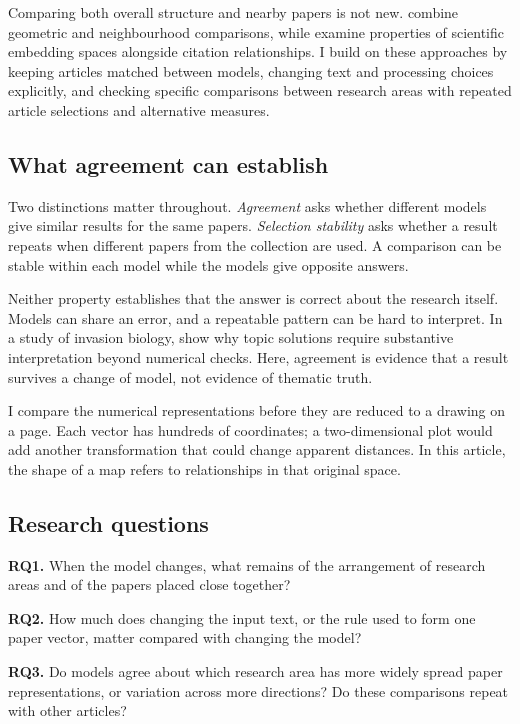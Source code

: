 \documentclass[12pt]{article}
\begin{document}
Comparing both overall structure and nearby papers is not new. \citet{ref4e1e0d5582} combine geometric and neighbourhood comparisons, while \citet{ref6da178065c} examine properties of scientific embedding spaces alongside citation relationships. I build on these approaches by keeping articles matched between models, changing text and processing choices explicitly, and checking specific comparisons between research areas with repeated article selections and alternative measures.

\subsection{What agreement can establish}
Two distinctions matter throughout. \emph{Agreement} asks whether different models give similar results for the same papers. \emph{Selection stability} asks whether a result repeats when different papers from the collection are used. A comparison can be stable within each model while the models give opposite answers.

Neither property establishes that the answer is correct about the research itself. Models can share an error, and a repeatable pattern can be hard to interpret. In a study of invasion biology, \citet{QSSreviewQ17} show why topic solutions require substantive interpretation beyond numerical checks. Here, agreement is evidence that a result survives a change of model, not evidence of thematic truth.

I compare the numerical representations before they are reduced to a drawing on a page. Each vector has hundreds of coordinates; a two-dimensional plot would add another transformation that could change apparent distances. In this article, the shape of a map refers to relationships in that original space.

\subsection{Research questions}
\textbf{RQ1.} When the model changes, what remains of the arrangement of research areas and of the papers placed close together?

\textbf{RQ2.} How much does changing the input text, or the rule used to form one paper vector, matter compared with changing the model?

\textbf{RQ3.} Do models agree about which research area has more widely spread paper representations, or variation across more directions? Do these comparisons repeat with other articles?
\end{document}
